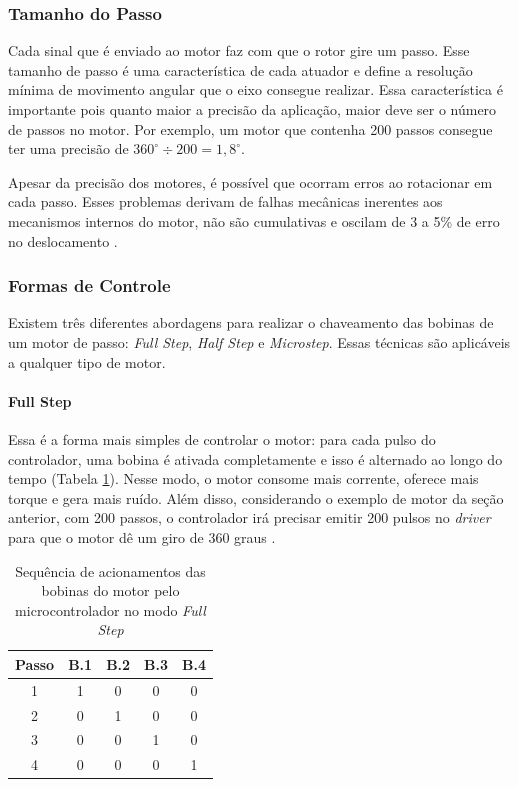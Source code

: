 \subsubsection{Tamanho do Passo}
Cada sinal que é enviado ao motor faz com que o rotor gire um passo. Esse tamanho de passo é uma característica de cada atuador e define a resolução mínima de movimento angular que o eixo consegue realizar. Essa característica é importante pois quanto maior a precisão da aplicação, maior deve ser o número de passos no motor. Por exemplo, um motor que contenha 200 passos consegue ter uma precisão de $ 360^{\circ} \div 200 = 1,8 ^{\circ} $.

Apesar da precisão dos motores, é possível que ocorram erros ao rotacionar em cada passo. Esses problemas derivam de falhas mecânicas inerentes aos mecanismos internos do motor, não são cumulativas e oscilam de 3 a 5\% de erro no deslocamento \cite{man:advancedmicrosystemStepControl}.

\subsubsection{Formas de Controle}
Existem três diferentes abordagens para realizar o chaveamento das bobinas de um motor de passo: \textit{Full Step}, \textit{Half Step} e \textit{Microstep}. Essas técnicas são aplicáveis a qualquer tipo de motor.

\paragraph{Full Step}
Essa é a forma mais simples de controlar o motor: para cada pulso do controlador, uma bobina é ativada completamente e isso é alternado ao longo do tempo (Tabela \ref{tab:fs}). Nesse modo, o motor consome mais corrente, oferece mais torque e gera mais ruído. Além disso, considerando o exemplo de motor da seção anterior, com 200 passos, o controlador irá precisar emitir 200 pulsos no \textit{driver} para que o motor dê um giro de 360 graus \cite{man:advancedmicrosystemStepControl}.

\begin{table}[!htb]
	\centering
	\caption{Sequência de acionamentos das bobinas do motor pelo microcontrolador no modo \textit{Full Step}}
	\begin{tabular}{c|c|c|c|c}
		Passo & B.1 & B.2 & B.3 & B.4 \\\hline
		1	& 1 & 0 & 0 & 0\\
		2	& 0 & 1 & 0 & 0\\
		3	& 0 & 0 & 1 & 0\\
		4	& 0 & 0	& 0 & 1		\\
	\end{tabular}
	\label{tab:fs}
	\fonte{}
\end{table}


